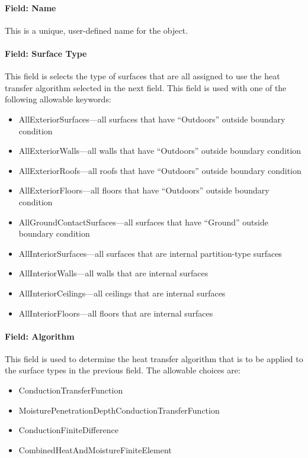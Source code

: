 \paragraph{Field: Name}\label{field-name-000}

This is a unique, user-defined name for the object.

\paragraph{Field: Surface Type}\label{field-surface-type}

This field is selects the type of surfaces that are all assigned to use the heat transfer algorithm selected in the next field. This field is used with one of the following allowable keywords:

\begin{itemize}
\item
  AllExteriorSurfaces---all surfaces that have ``Outdoors'' outside boundary condition
\item
  AllExteriorWalls---all walls that have ``Outdoors'' outside boundary condition
\item
  AllExteriorRoofs---all roofs that have ``Outdoors'' outside boundary condition
\item
  AllExteriorFloors---all floors that have ``Outdoors'' outside boundary condition
\item
  AllGroundContactSurfaces---all surfaces that have ``Ground'' outside boundary condition
\item
  AllInteriorSurfaces---all surfaces that are internal partition-type surfaces
\item
  AllInteriorWalls---all walls that are internal surfaces
\item
  AllInteriorCeilings---all ceilings that are internal surfaces
\item
  AllInteriorFloors---all floors that are internal surfaces
\end{itemize}

\paragraph{Field: Algorithm}\label{field-algorithm-1}

This field is used to determine the heat transfer algorithm that is to be applied to the surface types in the previous field. The allowable choices are:

\begin{itemize}
\item
  ConductionTransferFunction
\item
  MoisturePenetrationDepthConductionTransferFunction
\item
  ConductionFiniteDifference
\item
  CombinedHeatAndMoistureFiniteElement
\end{itemize}

